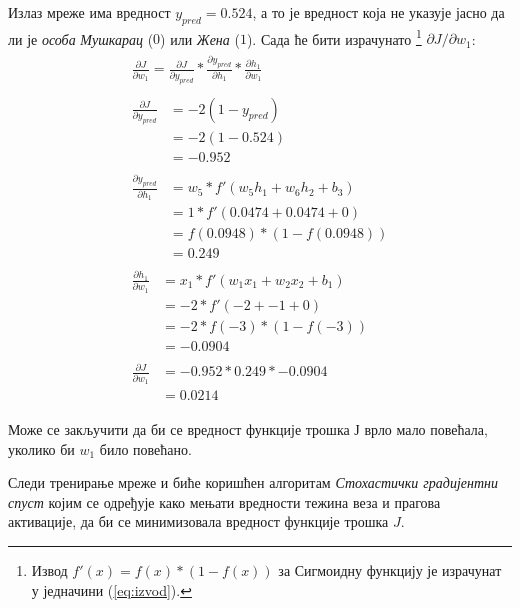 \documentclass[12pt, а4paper]{article}
\begin{document}
Излаз мреже има вредност $y_{pred}=0.524$, а то је вредност која
не указује јасно да ли је \textit{особа} \textit{Мушкарац} ($0$)
или \textit{Жена} ($1$). Сада ће бити израчунато
\footnote{\label{izvod} Извод $f'(x) = f(x) * (1-f(x))$ за Сигмоидну функцију
је израчунат у једначини (\ref{eq:izvod}).}
$\partial J / \partial w_1$:
\begin{equation}
\begin{gathered}
\begin{split}
\frac{\partial J}{\partial w_1} = \frac{\partial J}{\partial y_{pred}} * \frac{\partial y_{pred}}{\partial h_1} * \frac{\partial h_1}{\partial w_1}
\end{split} \\
\begin{split}
\frac{\partial J}{\partial y_{pred}} & = -2 (1 - y_{pred}) \\
& = -2 (1 - 0.524) \\
& = -0.952
\end{split}\\
\begin{split}
\frac{\partial y_{pred}}{\partial h_1} & = w_5 * f'(w_5 h_1 + w_6 h_2 + b_3) \\
& = 1 * f'(0.0474 + 0.0474 + 0) \\
& = f(0.0948) * (1- f(0.0948)) \\
& = 0.249
\end{split} \\
\begin{split}
\frac{\partial h_1}{\partial w_1} & = x_1 * f'(w_1 x_1 + w_2 x_2 + b_1) \\
& = -2 * f'(-2 + -1 + 0) \\
& = -2 * f(-3) * (1 - f(-3)) \\
& = -0.0904
\end{split} \\
\begin{split}
\frac{\partial J}{\partial w_1} & = -0.952 * 0.249 * -0.0904 \\
& = 0.0214
\end{split}
\end{gathered}
\end{equation}

Може се закључити да би се вредност функције трошка $Ј$ врло мало повећала,
уколико би $w_1$ било повећано.

Следи тренирање мреже и биће коришћен алгоритам
\textit{Стохастички градијентни спуст} којим се одређује како
мењати вредности тежина веза и прагова активације, да би се
минимизовала вредност функције трошка $J$.
\end{document}
